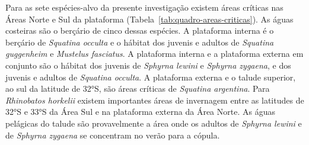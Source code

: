 \documentclass[a4paper,11pt,twoside,showtrims,onecolumn,openright,final]{memoir}
\begin{document}
Para as sete espécies-alvo da presente investigação existem áreas críticas nas Áreas 
Norte e Sul da plataforma (Tabela~\ref{tab:quadro-areas-criticas}). As águas costeiras são o 
berçário de cinco dessas  espécies. A plataforma interna é o berçário de \emph{Squatina occulta} 
e o hábitat dos juvenis e 
adultos de \emph{Squatina guggenheim} e \emph{Mustelus fasciatus}. A plataforma interna e a plataforma 
externa em conjunto são o hábitat dos juvenis de \emph{Sphyrna lewini} e \emph{Sphyrna zygaena}, e dos 
juvenis e adultos de \emph{Squatina occulta}. 
A plataforma externa e o talude superior, ao sul da latitude de 32°S, são áreas críticas de \emph{Squatina argentina}.
Para \emph{Rhinobatos horkelii} existem importantes áreas 
de invernagem entre as latitudes de 32°S e 33°S da Área Sul e na plataforma externa 
da Área Norte. As águas pelágicas do talude são provavelmente a área onde os adultos 
de \emph{Sphyrna lewini} e de \emph{Sphyrna zygaena} se concentram no verão para a cópula. 


\end{document}
